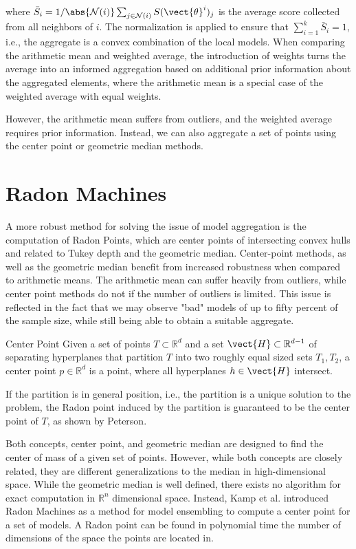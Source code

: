 where $\bar{S}_i = 1/\abs{\mathcal{N}(i)}\sum_{j\in \mathcal{N}(i)} S(\vect{\theta}^i)_j$ is the average score collected from all neighbors of $i$. 
The normalization is applied to ensure that $\sum_{i=1}^k \bar{S}_i = 1$, i.e., the aggregate is a convex combination of the local models.
When comparing the arithmetic mean and weighted average, the introduction of weights turns the average into an informed aggregation based on additional prior information about the aggregated elements, where the arithmetic mean is a special case of the weighted average with equal weights.

However, the arithmetic mean suffers from outliers, and the weighted average requires prior information.
Instead, we can also aggregate a set of points using the center point or geometric median methods.

\section{Radon Machines}
\label{ssec:radon}
A more robust method for solving the issue of model aggregation is the computation of Radon Points, which are center points of intersecting convex hulls and related to Tukey depth and the geometric median. 
Center-point methods, as well as the geometric median benefit from increased robustness when compared to arithmetic means.
The arithmetic mean can suffer heavily from outliers, while center point methods do not if the number of outliers is limited.
This issue is reflected in the fact that we may observe "bad" models of up to fifty percent of the sample size, while still being able to obtain a suitable aggregate.

\begin{definition}[parbox=false]{Center Point}
    Given a set of points $T \subset \mathbb{R}^{d}$ and a set  $\vect{H} \subset \mathbb{R}^{d-1}$ of separating hyperplanes that partition $T$  into two roughly equal sized sets $T_1, T_2$, a center point $p \in \mathbb{R}^d$ is a point, where all hyperplanes $h \in \vect{H}$ intersect.

    If the partition is in general position, i.e., the partition is a unique solution to the problem, the Radon point induced by the partition is guaranteed to be the center point of $T$, as shown by Peterson.~\cite{peterson1972geometry}
\end{definition}

Both concepts, center point, and geometric median are designed to find the center of mass of a given set of points.
However, while both concepts are closely related, they are different generalizations to the median in high-dimensional space.
While the geometric median is well defined, there exists no algorithm for exact computation in $\mathbb{R}^n$ dimensional space.
Instead, Kamp et al. \cite{kamp2017effective} introduced Radon Machines as a method for model ensembling to compute a center point for a set of models.
A Radon point can be found in polynomial time \wrt the number of dimensions of the space the points are located in.
